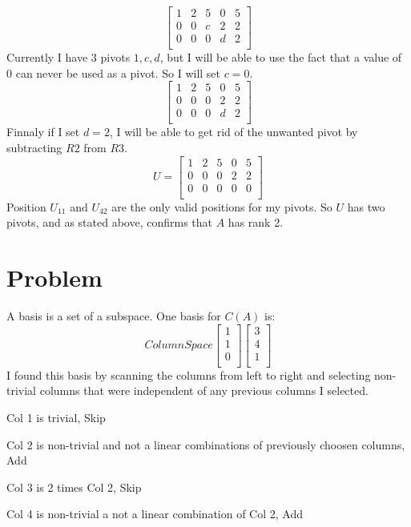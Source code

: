 \documentclass{article}
\begin{document}
\[
\begin{bmatrix}
1 & 2 & 5 & 0 & 5 \\
0 & 0 & c & 2 & 2 \\
0 & 0 & 0 & d & 2 \\
\end{bmatrix}
\]
Currently I have 3 pivots $1, c, d$, but I will be able to use the fact that a value of $0$ can never be used as a pivot. So I will set $c = 0$.
\[
\begin{bmatrix}
1 & 2 & 5 & 0 & 5 \\
0 & 0 & 0 & 2 & 2 \\
0 & 0 & 0 & d & 2 \\
\end{bmatrix}
\]
Finnaly if I set $d = 2$, I will be able to get rid of the unwanted pivot by subtracting $R2$ from $R3$.
\[
U =
\begin{bmatrix}
1 & 2 & 5 & 0 & 5 \\
0 & 0 & 0 & 2 & 2 \\
0 & 0 & 0 & 0 & 0 \\
\end{bmatrix}
\]
Position $U_{11}$ and $U_{42}$ are the only valid positions for my pivots. So $U$ has two pivots, and as stated above, confirms that $A$ has rank 2.
\section{Problem}
A basis is a set of a subspace. One basis for $C(A)$ is:
\[
Column Space
\begin{bmatrix}
1 \\
1 \\
0 \\
\end{bmatrix}
\begin{bmatrix}
3 \\
4 \\
1 \\
\end{bmatrix}
\]
I found this basis by scanning the columns from left to right and selecting non-trivial columns that were independent of any previous columns I selected.

Col 1 is trivial, Skip

Col 2 is non-trivial and not a linear combinations of previously choosen columns, Add

Col 3 is 2 times Col 2, Skip

Col 4 is non-trivial a not a linear combination of Col 2, Add
\end{document}
